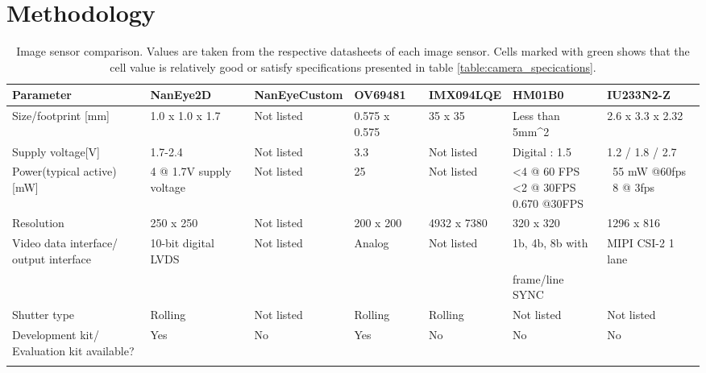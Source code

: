 \newpage 
\chapter{Methodology}
\label{sec:methodology}



\begin {table}[H]

\centering
\resizebox{1\textwidth}{!}
{\begin{tabular}{ | l | l | l | l | l | l | l |}
  \hline
  \textbf{Parameter} & \cellcolor{green!25} \textbf{NanEye2D} \cite{NanEye_datasheet}  & \textbf{NanEyeCustom} \cite{naneye_custom} & \textbf{OV69481} \cite{omnivision:ov6948}  & \textbf{IMX094LQE} \cite{IMX094LQE-J} & \textbf{HM01B0}\cite{HM01B0_datasheet} & \textbf{IU233N2-Z} \cite{IU233N2-Z} \\ \hline
  Size/footprint [mm] & \cellcolor{green!25} 1.0 x 1.0 x 1.7 & Not listed  & \cellcolor{green!25}0.575 x 0.575 & 35 x 35 & Less than 5mm^2 & 2.6 x 3.3 x 2.32\\
  \hline
  Supply voltage[V] & 1.7-2.4 & Not listed & 3.3 & Not listed & Digital : 1.5 & 1.2 / 1.8 / 2.7 \\
  \hline
  Power(typical active) [mW] &\cellcolor{green!25}  \pbox{20cm}{4 @ 1.7V supply\\voltage}& Not listed & 25 & Not listed & \cellcolor{green!25} \pbox{20cm}{  <4 @ 60 FPS \\  <2 @ 30FPS  \\
  0.670  @30FPS }& \pbox{20cm}{~55 mW @60fps\\
~8 @ 3fps} \\

\hline
Resolution  &\cellcolor{green!25}  250 x 250 & Not listed &\cellcolor{green!25}  200 x 200 & 4932 x 7380 & \cellcolor{green!25}320 x 320 & 1296 x 816 \\
\hline 
\pbox{20cm}{Video data interface/\\output interface} & 10-bit digital LVDS & Not listed & Analog & Not listed & 1b, 4b, 8b with & MIPI CSI-2 1 lane\\
& & & & &  frame/line SYNC &\\
\hline
Shutter type & Rolling & Not listed & Rolling & Rolling & Not listed & Not listed \\
\hline
\pbox{20cm}{Development kit/ \\Evaluation kit available?} & \cellcolor{green!25} Yes & No & \cellcolor{green!25} Yes & No & No & No\\
& \cellcolor{green!25} & &  \cellcolor{green!25}& & &\\
\hline
  
\end{tabular}}
\caption {Image sensor comparison. Values are taken from the respective datasheets of each image sensor. Cells marked with green shows that the cell value is relatively good or satisfy specifications presented in table \ref{table:camera_specications}. } \label{table:image_sensor_alternatives} 
\end {table}
